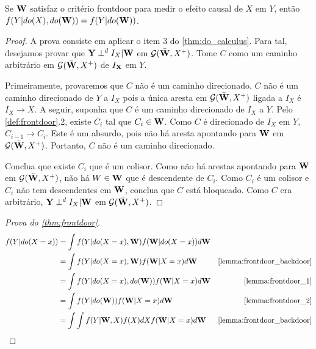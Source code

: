 \begin{lemma}
 \label{lemma:frontdoor_2}
 Se ${\mathbf{W}}$ satisfaz o critério frontdoor para
 medir o efeito causal de $X$ em $Y$, então
 $f(Y|do(X),do({\mathbf{W}})) = f(Y|do({\mathbf{W}}))$.
\end{lemma}

\begin{proof}
 A prova consiste em aplicar o item 3 do \cref{thm:do_calculus}.
 Para tal, desejamos provar que
 ${\mathbf{Y}} \perp^d I_{X} | {\mathbf{W}}$ em ${\mathcal G}(\bar{{\mathbf{W}}}, X^{+})$.
 Tome $C$ como um caminho arbitrário 
 em ${\mathcal G}(\bar{{\mathbf{W}}}, X^{+})$ de $I_{{\mathbf{X}}}$ em $Y$.
 
 Primeiramente, provaremos que $C$ não é um caminho direcionado.
 $C$ não é um caminho direcionado de $Y$ a $I_{X}$ pois
 a única aresta em ${\mathcal G}(\bar{{\mathbf{W}}}, X^{+})$ ligada a $I_{X}$ é
 $I_{X} \rightarrow X$. A seguir, 
 suponha que $C$ é um caminho direcionado de $I_{X}$ a $Y$.
 Pelo \cref{def:frontdoor}.2, existe $C_i$ tal que
 $C_i \in {\mathbf{W}}$. Como $C$ é direcionado de $I_X$ em $Y$,
 $C_{i-1} \rightarrow C_i$. Este é um absurdo, pois
 não há aresta apontando para ${\mathbf{W}}$ em ${\mathcal G}(\bar{{\mathbf{W}}}, X^{+})$.
 Portanto, $C$ não é um caminho direcionado.
 
 Conclua que existe $C_i$ que é um colisor.
 Como não há arestas apontando para ${\mathbf{W}}$ em ${\mathcal G}(\bar{{\mathbf{W}}}, X^{+})$,
 não há $W \in {\mathbf{W}}$ que é descendente de $C_i$. 
 Como $C_i$ é um colisor e 
 $C_i$ não tem descendentes em ${\mathbf{W}}$,
 conclua que $C$ está bloqueado.
 Como $C$ era arbitrário,
 ${\mathbf{Y}} \perp^d I_{X} | {\mathbf{W}}$ em ${\mathcal G}(\bar{{\mathbf{W}}}, X^{+})$.
\end{proof}

\begin{proof}[Prova do \cref{thm:frontdoor}]
 \begin{align*}
  f(Y|do(X=x))
  &= \int f(Y|do(X=x),\W)f(\W|do(X=x))d\W \\
  &= \int f(Y|do(X=x),\W)f(\W|X=x)d\W 
  & \text{\cref{lemma:frontdoor_backdoor}} \\
  &= \int f(Y|do(X=x),do(\W))f(\W|X=x)d\W 
  & \text{\cref{lemma:frontdoor_1}} \\
  &= \int f(Y|do(\W))f(\W|X=x)d\W 
  & \text{\cref{lemma:frontdoor_2}} \\
  &= \int \int f(Y|\W,X)f(X)dX f(\W|X=x)d\W
  & \text{\cref{lemma:frontdoor_backdoor}}
 \end{align*}
\end{proof}

\subsection{}

